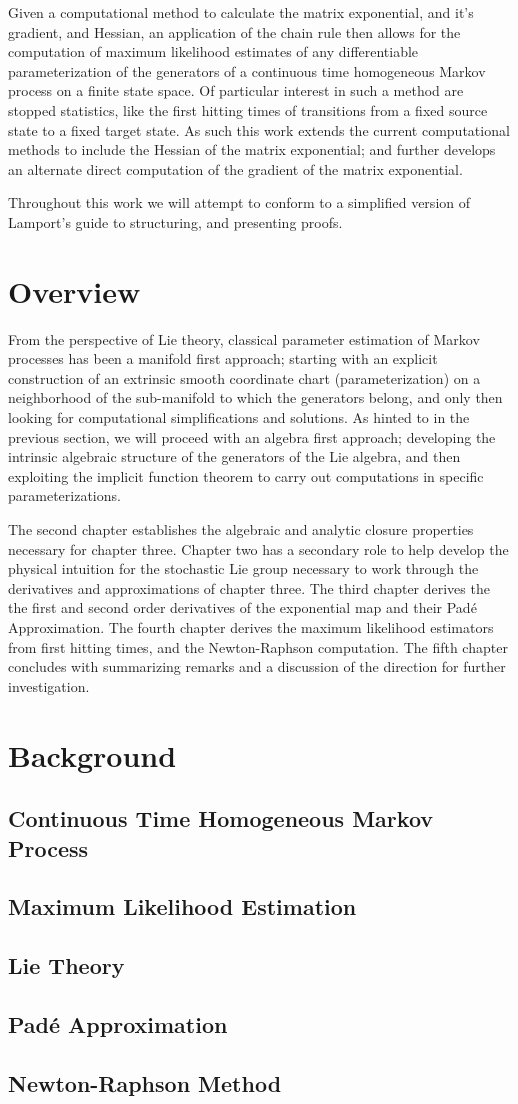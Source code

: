 Given a computational method to calculate the matrix exponential, and it's 
gradient, and Hessian, an application of the chain rule then allows for the 
computation of maximum likelihood estimates of any differentiable
parameterization of the generators of a continuous time homogeneous Markov 
process on a finite state space. Of particular interest in such a method are stopped statistics, like the first hitting 
times of transitions from a fixed source state to a fixed target state. As such 
this work extends the current computational methods to include the Hessian of the 
matrix exponential; and further develops an alternate direct computation of the 
gradient of the matrix exponential.

Throughout this work we will attempt to conform to a simplified version of 
Lamport's guide to structuring, and presenting proofs\cite{lamport_how_2012}.

\section{Overview}
From the perspective of Lie theory, classical parameter estimation of Markov 
processes has been a manifold first approach; starting with an explicit 
construction of an extrinsic smooth coordinate chart (parameterization) on a 
neighborhood of the sub-manifold to which the generators belong, and only then 
looking for computational simplifications and solutions. As hinted to in the 
previous section, we will proceed with an algebra first approach; developing the 
intrinsic algebraic structure of the generators of the Lie algebra, and then 
exploiting the implicit function theorem to carry out computations in specific 
parameterizations.

The second chapter establishes the algebraic and analytic closure properties
necessary for chapter three. Chapter two has a secondary role to help develop the 
physical intuition for the stochastic Lie group necessary to work through the 
derivatives and approximations of chapter three.
The third chapter derives the the first and second order derivatives of the exponential
map and their Pad\'{e} Approximation.
The fourth chapter derives the maximum likelihood estimators from first hitting times, and the Newton-Raphson computation.
The fifth chapter concludes with summarizing remarks and a discussion of the direction
for further investigation.
\section{Background}
\subsection{Continuous Time Homogeneous Markov Process}
\subsection{Maximum Likelihood Estimation}
\subsection{Lie Theory}
\subsection{Pad\'{e} Approximation}
\subsection{Newton-Raphson Method}
